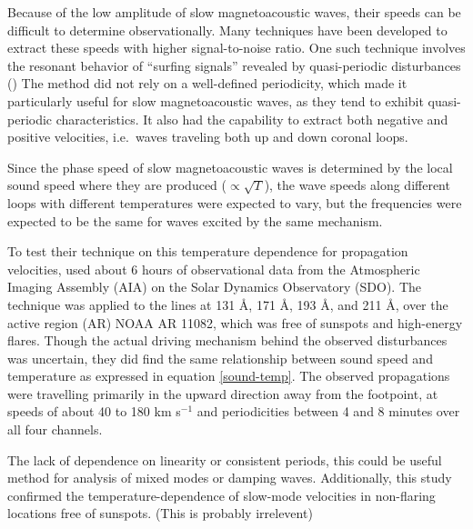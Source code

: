 \documentclass[preprint2]{aastex}
\begin{document}
Because of the low amplitude of slow magnetoacoustic waves, their
speeds can be difficult to determine observationally. Many techniques
have been developed to extract these speeds with higher signal-to-noise
ratio. One such technique
involves the resonant behavior of ``surfing signals''
revealed by quasi-periodic disturbances (\cite{pac_2})
The method did not rely on a well-defined periodicity, which made it
particularly useful for slow magnetoacoustic waves, as they tend to
exhibit quasi-periodic characteristics. It also had the capability
to extract both negative and positive velocities, i.e.\ waves traveling
both up and down coronal loops.

Since the phase speed of slow magnetoacoustic waves is determined by
the local sound speed where they are produced ($\propto\sqrt{T}$),
the wave speeds along
different loops with different temperatures were expected to vary,
but the frequencies were expected to be the same for waves excited
by the same mechanism.

To test their technique on this temperature dependence for propagation
velocities, {\cite{pac_2}} used
about 6 hours of observational data from the
Atmospheric Imaging Assembly (AIA) on the Solar Dynamics Observatory (SDO).
The technique was applied to the lines at
131 \AA{}, 171 \AA{}, 193 \AA{}, and 211 \AA{},
over the active region (AR) NOAA AR 11082, which was free of sunspots
and high-energy flares.
Though the actual driving mechanism behind the observed disturbances
was uncertain, they did find
the same relationship between sound speed and temperature
as expressed in equation {\ref{sound-temp}}.
The observed propagations were
travelling primarily in the upward direction away from the footpoint,
at speeds of about 40 to 180 km s$^{-1}$ and periodicities between 4
and 8 minutes over all four channels.

The lack of dependence on linearity or consistent periods, this could
be useful method for analysis of mixed modes or damping waves.
Additionally, this study confirmed the temperature-dependence of
slow-mode velocities in non-flaring locations free of sunspots.
(This is probably irrelevent)
\end{document}

